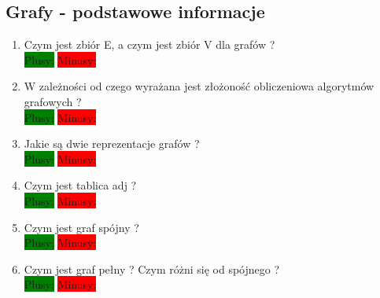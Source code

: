 \documentclass[a4paper,11pt]{article}
\begin{document}
\subsection{Grafy - podstawowe informacje}
\begin{enumerate}
\item Czym jest zbiór E, a czym jest zbiór V dla grafów ? 
\\ \colorbox{green}{Plusy:} \colorbox{red}{Minusy: } 

\item W zależności od czego wyrażana jest złożoność obliczeniowa algorytmów grafowych ?
\\ \colorbox{green}{Plusy:} \colorbox{red}{Minusy: } 

\item Jakie są dwie reprezentacje grafów ?
\\ \colorbox{green}{Plusy:} \colorbox{red}{Minusy: } 

\item Czym jest tablica adj ?
\\ \colorbox{green}{Plusy:} \colorbox{red}{Minusy: } 

\item Czym jest graf spójny ?
\\ \colorbox{green}{Plusy:} \colorbox{red}{Minusy: } 

\item Czym jest graf pełny ? Czym różni się od spójnego ?
\\ \colorbox{green}{Plusy:} \colorbox{red}{Minusy: } 

\end{enumerate}
\end{document}
